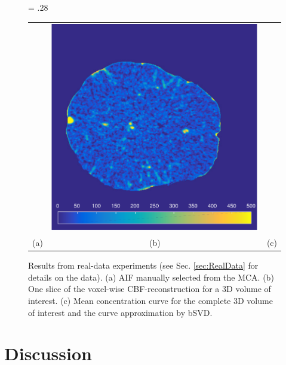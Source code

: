 \documentclass[journal,twocolumn]{IEEEtran}
\newlength{\fwd}
\begin{document}
	\begin{figure}[h!tb]\label{fig:RealData}
		\fwd = .28\textwidth
		\centering
		\begin{tabular}{ccc}
		 {\tiny} & \includegraphics[width = \fwd]{./figs/real_axial160.pdf} & {\tiny} \\
		 (a) & (b) & (c) 
		\end{tabular}
		\caption{Results from real-data experiments (see Sec. \ref{sec:RealData} for details on the data). (a) AIF manually selected from the MCA. (b) One slice of the voxel-wise CBF-reconstruction for a 3D volume of interest. (c) Mean concentration curve for the complete 3D volume of interest and the curve approximation by bSVD.}
	\end{figure}
	

	
	
	\section{Discussion}\label{sec:conclusion}
	
\end{document}
